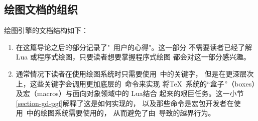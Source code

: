 \subsection{绘图文档的组织}

绘图引擎的文档结构如下：
\begin{enumerate}
\item 在这篇导论之后的部分记录了"\tikzname\ 用户的心得"。这一部分
不需要读者已经了解Lua 或程序式绘图，只要读者想要掌握程序式绘图
都会对这一部分感兴趣。
\item 通常情况下读者在使用绘图系统时只需要使用\tikzname\ 中的关键字，
但是在更深层次上，这些关键字会调用更加底层的\pgfname\ 命令来实现
将\TeX\ 系统的“盒子”（boxes）及宏（macros）与面向对象领域中的 Lua结合
起来的艰巨任务。这一小节\ref{section-gd-pgf}解释了这是如何实现的，
以及那些命令是宏包开发者在使用\pgfname\ 中的绘图系统需要使用的，
从而避免了由\tikzname\ 导致的越界行为。


\end{enumerate}
